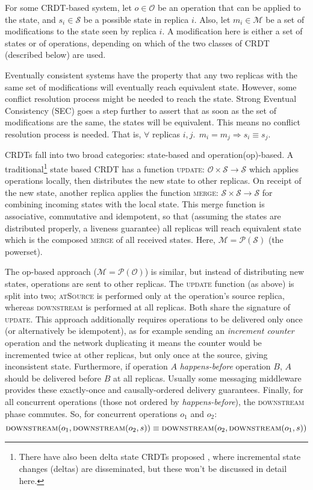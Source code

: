 \documentclass[diss.tex]{subfiles}
\begin{document}
For some CRDT-based system, let $o \in \mathcal{O}$ be an operation that can be applied to the state, and $s_i \in \mathcal{S}$ be a possible state in replica $i$. Also, let $m_i \in \mathcal{M}$ be a set of modifications to the state seen by replica $i$. A modification here is either a set of states or of operations, depending on which of the two classes of CRDT (described below) are used.

 Eventually consistent systems have the property that any two replicas with the same set of modifications will eventually reach equivalent state. However, some conflict resolution process might be needed to reach the state.
 Strong Eventual Consistency (SEC) goes a step further to assert that as soon as the set of modifications are the same, the states will be equivalent. This means no conflict resolution process is needed. That is, $\forall $ replicas $i,j.~~m_i = m_j \Rightarrow s_i \equiv s_j$.
 
 
CRDTs fall into two broad categories: state-based and operation(op)-based. 
A traditional\footnote{There have also been delta state CRDTs proposed \cite{deltacrdts}, where incremental state changes (deltas) are disseminated, but these won't be discussed in detail here.} state based CRDT has a function \textsc{update}: $\mathcal{O} \times \mathcal{S} \rightarrow \mathcal{S}$
which applies operations locally, then distributes the new state to other replicas. On receipt of the new state, another replica applies the function \textsc{merge}: $\mathcal{S} \times \mathcal{S} \rightarrow \mathcal{S}$  for combining incoming states with the local state. This merge function is associative, commutative and idempotent, so that (assuming the states are distributed properly, a liveness guarantee) all replicas will reach equivalent state which is the composed \textsc{merge} of all received states. Here, $\mathcal{M} = \mathcal{P}(\mathcal{S})$ (the powerset).


The op-based approach ($\mathcal{M} = \mathcal{P}(\mathcal{O})$) is similar, but instead of distributing new states, operations are sent to other replicas. The \textsc{update} function (as above) is split into two; \textsc{atSource} is performed only at the operation's source replica, whereas \textsc{downstream} is performed at all replicas. Both share the signature of \textsc{update}.
This approach additionally requires operations to be delivered only once (or alternatively be idempotent), as for example sending an \textit{increment counter} operation and the network duplicating it means the counter would be incremented twice at other replicas, but only once at the source, giving inconsistent state. 
Furthermore, if operation $A$ \textit{happens-before} \cite{lamportshappensbefore} operation $B$, $A$ should be delivered before $B$ at all replicas. Usually some messaging middleware provides these exactly-once and causally-ordered delivery guarantees. Finally, for all concurrent operations (those not ordered by \textit{happens-before}), the \textsc{downstream} phase commutes. So, for concurrent operations $o_1$ and $o_2$: $$\textsc{downstream}(o_1, \textsc{downstream}(o_2, s)) \equiv \textsc{downstream}(o_2, \textsc{downstream}(o_1, s))$$
\end{document}
